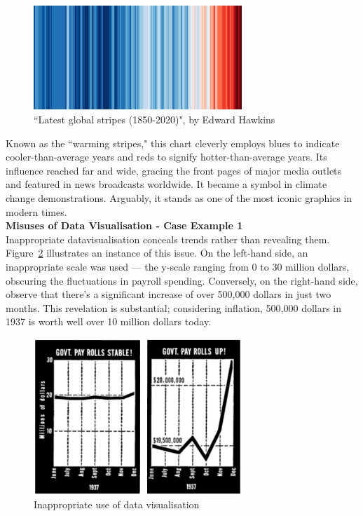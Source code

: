 \documentclass{article}\usepackage[]{graphicx}\usepackage[]{xcolor}
\begin{document}
\begin{figure}[H]
    \centering
    \includegraphics[width=0.7\textwidth]{global.png}
    \caption{``Latest global stripes (1850-2020)", by Edward Hawkins\cite{blog}}
    \label{fig:global}
\end{figure}

\noindent 
Known as the ``warming stripes," this chart cleverly employs blues to indicate cooler-than-average years and reds to signify hotter-than-average years. Its influence reached far and wide, gracing the front pages of major media outlets and featured in news broadcasts worldwide. It became a symbol in climate change demonstrations. Arguably, it stands as one of the most iconic graphics in modern times.\\

\noindent
\textbf{Misuses of Data Visualisation - Case Example 1}\\

\noindent
Inappropriate datavisualisation conceals trends rather than revealing them. Figure~\ref{fig:misuse1} illustrates an instance of this issue. On the left-hand side, an inappropriate scale was used --- the y-scale ranging from 0 to 30 million dollars, obscuring the fluctuations in payroll spending. Conversely, on the right-hand side, observe that there's a significant increase of over 500,000 dollars in just two months. This revelation is substantial; considering inflation, 500,000 dollars in 1937 is worth well over 10 million dollars today\cite{worth}.

\begin{figure}[H]
    \centering
    \includegraphics[width=0.7\textwidth]{misuse1.png}
    \caption{Inappropriate use of data visualisation\cite{lie}}
    \label{fig:misuse1}
\end{figure}
\end{document}
